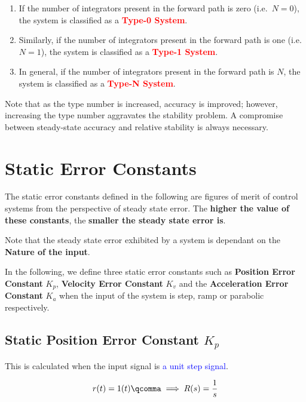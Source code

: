 \documentclass[
  14pt,
  a4paper,
  oneside,
  open=any,
  a4paper,
  14pt]{report}
\begin{document}
\begin{enumerate}
\def\labelenumi{\arabic{enumi}.}
\item
  If the number of integrators present in the forward path is zero
  (i.e.~\(N=0\)), the system is classified as a
  \textcolor{red}{\textbf{Type-0 System}}.
\item
  Similarly, if the number of integrators present in the forward path is
  one (i.e.~\(N=1\)), the system is classified as a
  \textcolor{red}{\textbf{Type-1 System}}.
\item
  In general, if the number of integrators present in the forward path
  is \(N\), the system is classified as a \textcolor{red}{\textbf{Type-N
  System}}.
\end{enumerate}

Note that as the type number is increased, accuracy is improved;
however, increasing the type number aggravates the stability problem. A
compromise between steady-state accuracy and relative stability is
always necessary.

\section{Static Error Constants}\label{static-error-constants}

The static error constants defined in the following are figures of merit
of control systems from the perspective of steady state error. The
\textbf{higher the value of these constants}, the \textbf{smaller the
steady state error is}.

Note that the steady state error exhibited by a system is dependant on
the \textbf{Nature of the input}.

In the following, we define three static error constants such as
\textbf{Position Error Constant} \(K_p\), \textbf{Velocity Error
Constant} \(K_v\) and the \textbf{Acceleration Error Constant} \(K_a\)
when the input of the system is step, ramp or parabolic respectively.

\subsection{\texorpdfstring{Static Position Error Constant
\(K_p\)}{Static Position Error Constant K\_p}}\label{static-position-error-constant-k_p}

This is calculated when the input signal is \textcolor{blue}{a unit step
signal}.

\[
    r(t) = 1(t)\qcomma \implies R(s) = \dfrac{1}{s}
\]
\end{document}
